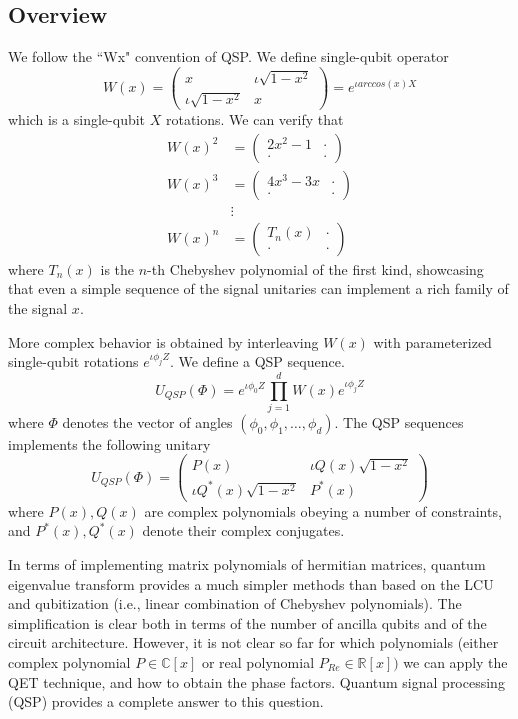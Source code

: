 \documentclass[12pt, oneside]{book}
\theoremstyle{definition}
\theoremstyle{definition}
\theoremstyle{remark}
\begin{document}
\subsection{Overview}
We follow the ``Wx" convention of QSP. We define single-qubit operator
\[
W(x)=\begin{pmatrix} x & \iota \sqrt{1-x^2} \\ \iota \sqrt{1-x^2} & x \end{pmatrix}=e^{\iota arccos(x)X}
\]
which is a single-qubit $X$ rotations. We can verify that
\begin{align*}
    W(x)^2 &= \begin{pmatrix} 2x^2-1 & \cdot \\
    \cdot & \cdot \end{pmatrix}\\
    W(x)^3 &= \begin{pmatrix} 4x^3-3x & \cdot \\ \cdot & \cdot \end{pmatrix} \\
    &\vdots \\
    W(x)^n &= \begin{pmatrix} T_n(x) & \cdot \\
    \cdot & \cdot \end{pmatrix}
\end{align*}
where $T_n(x)$ is the $n$-th Chebyshev polynomial of the first kind, showcasing that even a simple sequence of the signal unitaries can implement a rich family of the signal $x$.

More complex behavior is obtained by interleaving $W(x)$ with parameterized single-qubit rotations $e^{\iota \phi_j Z}$. We define a QSP sequence.
\[
U_{QSP}(\Phi) = e^{\iota \phi_0 Z}\prod_{j=1}^d W(x)e^{\iota \phi_j Z}
\]
where $\Phi$ denotes the vector of angles $(\phi_0,\phi_1,\ldots,\phi_d)$. The QSP sequences implements the following unitary
\[
U_{QSP}(\Phi) = \begin{pmatrix} P(x) & \iota Q(x)\sqrt{1-x^2} \\ \iota Q^*(x)\sqrt{1-x^2} & P^*(x) \end{pmatrix}
\]
where $P(x),Q(x)$ are complex polynomials obeying a number of constraints, and $P^*(x), Q^*(x)$ denote their complex conjugates.

In terms of implementing matrix polynomials of hermitian matrices, quantum eigenvalue transform provides a much simpler methods than based on the LCU and qubitization (i.e., linear combination of Chebyshev polynomials). The simplification is clear both in terms of the number of ancilla qubits and of the circuit architecture. However, it is not clear so far for which polynomials (either complex polynomial $P \in \mathbb{C}[x]$ or real polynomial $P_{Re} \in \mathbb{R}[x])$ we can apply the QET technique, and how to obtain the phase factors. Quantum signal processing (QSP) provides a complete answer to this question.
\end{document}
